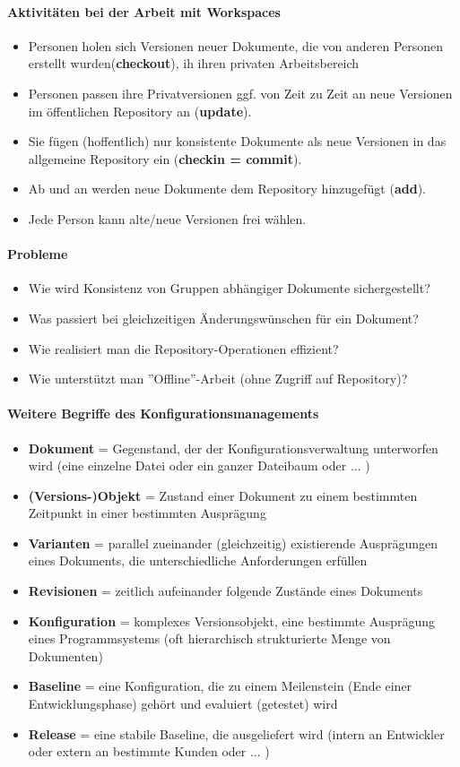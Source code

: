 \paragraph{Aktivitäten bei der Arbeit mit Workspaces}
\begin{itemize}
	\item Personen holen sich Versionen neuer Dokumente, die von anderen Personen erstellt wurden(\textbf{checkout}), ih ihren privaten Arbeitsbereich
	\item Personen passen ihre Privatversionen ggf. von Zeit zu Zeit an neue Versionen im öffentlichen Repository an (\textbf{update}).
	\item Sie fügen (hoffentlich) nur konsistente Dokumente als neue Versionen in das allgemeine Repository ein (\textbf{checkin = commit}).
	\item Ab und an werden neue Dokumente dem Repository hinzugefügt (\textbf{add}). 
	\item Jede Person kann alte/neue Versionen frei wählen.
\end{itemize}
\paragraph{Probleme}
\begin{itemize}
	\item Wie wird Konsistenz von Gruppen abhängiger Dokumente sichergestellt?
	\item Was passiert bei gleichzeitigen Änderungswünschen für ein Dokument?
	\item Wie realisiert man die Repository-Operationen effizient?
	\item Wie unterstützt man ''Offline''-Arbeit (ohne Zugriff auf Repository)?
\end{itemize}
\paragraph{Weitere Begriffe des Konfigurationsmanagements}
\begin{itemize}
	\item \textbf{Dokument} = Gegenstand, der der Konfigurationsverwaltung unterworfen wird (eine einzelne Datei oder ein ganzer Dateibaum oder ... )
	\item \textbf{(Versions-)Objekt} = Zustand einer Dokument zu einem bestimmten Zeitpunkt in einer bestimmten Ausprägung
	\item \textbf{Varianten} = parallel zueinander (gleichzeitig) existierende Ausprägungen eines Dokuments, die unterschiedliche Anforderungen erfüllen
	\item \textbf{Revisionen} = zeitlich aufeinander folgende Zustände eines Dokuments
	\item  \textbf{Konfiguration} = komplexes Versionsobjekt, eine bestimmte Ausprägung eines Programmsystems (oft hierarchisch strukturierte Menge von Dokumenten)
	\item \textbf{Baseline} = eine Konfiguration, die zu einem Meilenstein (Ende einer Entwicklungsphase) gehört und evaluiert (getestet) wird
	\item \textbf{Release} = eine stabile Baseline, die ausgeliefert wird (intern an Entwickler oder extern an bestimmte Kunden oder ... )
\end{itemize}
